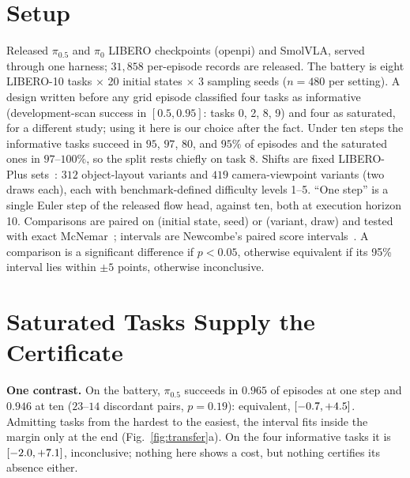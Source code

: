 \documentclass[conference]{IEEEtran}
\begin{document}
\section{Setup}\label{sec:protocol}
Released $\pi_{0.5}$ and $\pi_0$ LIBERO checkpoints (openpi) and SmolVLA,
served through one harness; $31{,}858$ per-episode records are released.
The battery is eight LIBERO-10 tasks $\times$ 20 initial states $\times$
3 sampling seeds ($n{=}480$ per setting). A design written before any
grid episode classified four tasks as informative (development-scan
success in $[0.5, 0.95]$: tasks 0, 2, 8, 9) and four as saturated, for a
different study; using it here is our choice after the fact. Under ten
steps the informative tasks succeed in $95$, $97$, $80$, and $95\%$ of
episodes and the saturated ones in $97$--$100\%$, so the split rests
chiefly on task 8. Shifts are fixed LIBERO-Plus sets~\cite{fei2025liberoplus}:
$312$ object-layout variants and $419$ camera-viewpoint variants (two
draws each), each with benchmark-defined difficulty levels 1--5. ``One
step'' is a single Euler step of the released flow head, against ten,
both at execution horizon 10. Comparisons are paired on (initial state,
seed) or (variant, draw) and tested with exact McNemar~\cite{mcnemar1947};
intervals are Newcombe's paired score intervals~\cite{newcombe1998paired}.
A comparison is a significant difference if $p{<}0.05$, otherwise
equivalent if its 95\% interval lies within $\pm5$ points, otherwise inconclusive.

\section{Saturated Tasks Supply the Certificate}\label{sec:dilution}
\textbf{One contrast.} On the battery, $\pi_{0.5}$ succeeds in $0.965$ of
episodes at one step and $0.946$ at ten ($23$--$14$ discordant pairs,
$p{=}0.19$): equivalent, $[-0.7, +4.5]$. Admitting tasks
from the hardest to the easiest, the interval fits inside the margin
only at the end (Fig.~\ref{fig:transfer}a). On the four informative
tasks it is $[-2.0, +7.1]$, inconclusive; nothing
here shows a cost, but nothing certifies its absence either.
\end{document}
